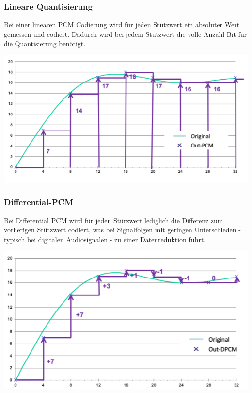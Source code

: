 \subsubsection{Lineare Quantisierung}%
Bei einer linearen PCM Codierung wird für jeden Stützwert ein absoluter Wert gemessen und codiert. Dadurch wird bei jedem Stützwert die volle Anzahl Bit für die Quantisierung benötigt.
\begin{center}
    \includegraphics[width=1\linewidth]{images/linearq.png}
\end{center}

\subsubsection{Differential-PCM}%
Bei Differential PCM wird für jeden Stürzwert lediglich die Differenz zum vorherigen Stützwert codiert, was bei Signalfolgen mit geringen Unterschieden - typisch bei digitalen Audiosignalen - zu einer Datenreduktion führt.

\begin{center}
    \includegraphics[width=1\linewidth]{images/dpcm.png}
\end{center}

